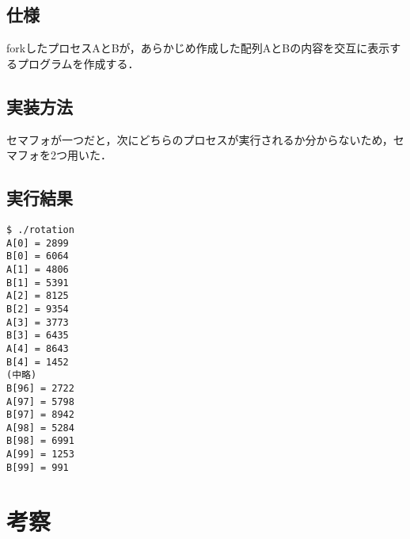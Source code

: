 \documentclass[a4j,10pt,titlepage]{jsarticle}
\begin{document}
\subsection{仕様}
forkしたプロセスAとBが，あらかじめ作成した配列AとBの内容を交互に表示するプログラムを作成する．

\subsection{実装方法}
セマフォが一つだと，次にどちらのプロセスが実行されるか分からないため，セマフォを2つ用いた．

\subsection{実行結果}
\begin{verbatim}
$ ./rotation 
A[0] = 2899
B[0] = 6064
A[1] = 4806
B[1] = 5391
A[2] = 8125
B[2] = 9354
A[3] = 3773
B[3] = 6435
A[4] = 8643
B[4] = 1452
(中略)
B[96] = 2722
A[97] = 5798
B[97] = 8942
A[98] = 5284
B[98] = 6991
A[99] = 1253
B[99] = 991
\end{verbatim}

\section{考察}
\end{document}

